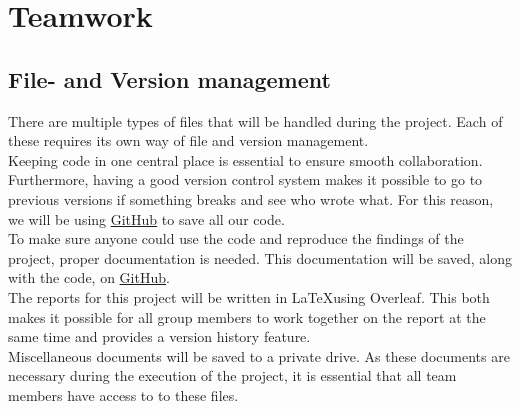 \section{Teamwork}

\subsection{File- and Version management}
There are multiple types of files that will be handled during the project. Each of these requires its own way of file and version management.
\\
Keeping code in one central place is essential to ensure smooth collaboration. Furthermore, having a good version control system makes it possible to go to previous versions if something breaks and see who wrote what. For this reason, we will be using \href{https://github.com/rbithray/CapstoneAI-Toxicity}{GitHub} to save all our code.
\\
To make sure anyone could use the code and reproduce the findings of the project, proper documentation is needed. This documentation will be saved, along with the code, on \href{https://github.com/rbithray/CapstoneAI-Toxicity}{GitHub}.
\\
The reports for this project will be written in \LaTeX using Overleaf. This both makes it possible for all group members to work together on the report at the same time and provides a version history feature.
\\
Miscellaneous documents will be saved to a private drive. As these documents are necessary during the execution of the project, it is essential that all team members have access to to these files.
